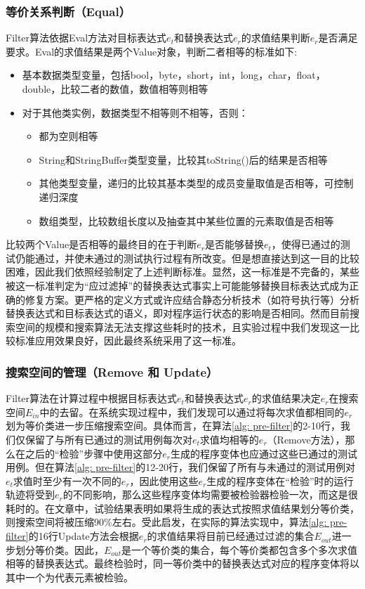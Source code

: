 \subsubsection{等价关系判断（Equal）}
Filter算法依据Eval方法对目标表达式$e_t$和替换表达式$e_r$的求值结果判断$e_r$是否满足要求。Eval的求值结果是两个Value对象，判断二者相等的标准如下:
\begin{itemize}
	\item 基本数据类型变量，包括bool，byte，short，int，long，char，float，double，比较二者的数值，数值相等则相等
	\item 对于其他类实例，数据类型不相等则不相等，否则：
	\begin{itemize}
		\item 都为空则相等
		\item String和StringBuffer类型变量，比较其toString()后的结果是否相等
		\item 其他类型变量，递归的比较其基本类型的成员变量取值是否相等，可控制递归深度
		\item 数组类型，比较数组长度以及抽查其中某些位置的元素取值是否相等
	\end{itemize}
\end{itemize}

比较两个Value是否相等的最终目的在于判断$e_r$是否能够替换$e_t$，使得已通过的测试仍能通过，并使未通过的测试执行过程有所改变。但是想直接达到这一目的比较困难，因此我们依照经验制定了上述判断标准。显然，这一标准是不完备的，某些被这一标准判定为“应过滤掉”的替换表达式事实上可能能够替换目标表达式成为正确的修复方案。更严格的定义方式或许应结合静态分析技术（如符号执行等）分析替换表达式和目标表达式的语义，即对程序运行状态的影响是否相同。然而目前搜索空间的规模和搜索算法无法支撑这些耗时的技术，且实验过程中我们发现这一比较标准应用效果良好，因此最终系统采用了这一标准。

\subsubsection{搜索空间的管理（Remove 和 Update）}

Filter算法在计算过程中根据目标表达式$e_t$和替换表达式$e_r$的求值结果决定$e_r$在搜索空间$E_{in}$中的去留。在系统实现过程中，我们发现可以通过将每次求值都相同的$e_r$划为等价类进一步压缩搜索空间。具体而言，在算法\ref{alg: pre-filter}的2-10行，我们仅保留了与所有已通过的测试用例每次对$e_t$求值均相等的$e_r$（Remove方法），那么在之后的“检验”步骤中使用这部分$e_r$生成的程序变体也应通过这些已通过的测试用例。但在算法\ref{alg: pre-filter}的12-20行，我们保留了所有与未通过的测试用例对$e_t$求值时至少有一次不同的$e_r$，因此使用这些$e_r$生成的程序变体在“检验”时的运行轨迹将受到$e_r$的不同影响，那么这些程序变体均需要被检验器检验一次，而这是很耗时的。在文章\cite{Galenson:2014:CDI:2568225.2568250}中，试验结果表明如果将生成的表达式按照求值结果划分等价类，则搜索空间将被压缩90\%左右。受此启发，在实际的算法实现中，算法\ref{alg: pre-filter}的16行Update方法会根据$e_r$的求值结果将目前已经通过过滤的集合$E_{out}$进一步划分等价类。因此，$E_{out}$是一个等价类的集合，每个等价类都包含多个多次求值相等的替换表达式。最终检验时，同一等价类中的替换表达式对应的程序变体将以其中一个为代表元素被检验。


